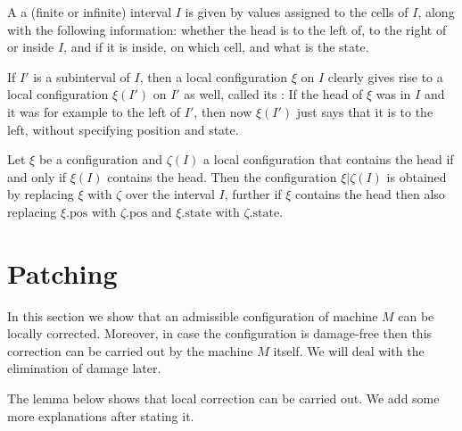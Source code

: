 \documentclass[12pt]{memoir}
\def\B{B}
\newcommand{\pos}{\mathrm{pos}}
\newcommand{\state}{\mathrm{state}}
\begin{document}
\begin{definition}
\label{def:local-config}
  A  a (finite or infinite)
  interval \( I \) is given by values assigned to the cells
  of \( I \), along with the following information: whether
  the head is to the left of, to the right of or inside
  \( I \), and if it is inside, on which cell, and what is
  the state.

  If \( I' \) is a subinterval of \( I \), then a local configuration
  \( \xi \) on \( I \) clearly gives rise to a local configuration
  \( \xi(I') \) on \( I' \) as well, called its
  : If the head of \( \xi \) was in \( I \)
  and it was for example to the left of \( I' \), then now
  \( \xi(I') \) just says that it is to the left, without
  specifying position and state.

  Let \( \xi \) be a configuration and \( \zeta(I) \) a local
  configuration that contains the head if and only if
  \( \xi(I) \) contains the head.
  Then the configuration \( \xi|\zeta(I) \) is obtained by
  replacing \( \xi \) with \( \zeta \) over the interval \( I \),
  further if \( \xi \) contains the head then also replacing
  \( \xi.\pos \) with \( \zeta.\pos \) and \( \xi.\state \) with
  \( \zeta.\state \).
\end{definition}


\section{Patching}\label{sec:patching}

In this section we show that an admissible configuration of machine \( M \)
can be locally corrected.
Moreover, in case the configuration is damage-free then this correction
can be carried out by the machine \( M \) itself.
We will deal with the elimination of damage later.

The lemma below shows that local correction can be carried out.
We add some more explanations after stating it.

\end{document}
